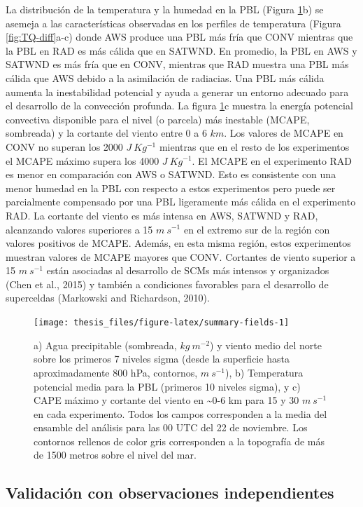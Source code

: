 \documentclass[12pt,oneside,a4paper]{reedthesis}
\begin{document}
La distribución de la temperatura y la humedad en la PBL (Figura \ref{fig:summary-fields}b) se asemeja a las características observadas en los perfiles de temperatura (Figura \ref{fig:TQ-diff}a-c) donde AWS produce una PBL más fría que CONV mientras que la PBL en RAD es más cálida que en SATWND. En promedio, la PBL en AWS y SATWND es más fría que en CONV, mientras que RAD muestra una PBL más cálida que AWS debido a la asimilación de radiacias. Una PBL más cálida aumenta la inestabilidad potencial y ayuda a generar un entorno adecuado para el desarrollo de la convección profunda. La figura \ref{fig:summary-fields}c muestra la energía potencial convectiva disponible para el nivel (o parcela) más inestable (MCAPE, sombreada) y la cortante del viento entre 0 a 6 \(km\). Los valores de MCAPE en CONV no superan los 2000 \(J\ Kg^{-1}\) mientras que en el resto de los experimentos el MCAPE máximo supera los 4000 \(J\ Kg^{-1}\). El MCAPE en el experimento RAD es menor en comparación con AWS o SATWND. Esto es consistente con una menor humedad en la PBL con respecto a estos experimentos pero puede ser parcialmente compensado por una PBL ligeramente más cálida en el experimento RAD. La cortante del viento es más intensa en AWS, SATWND y RAD, alcanzando valores superiores a 15 \(m\ s^{-1}\) en el extremo sur de la región con valores positivos de MCAPE. Además, en esta misma región, estos experimentos muestran valores de MCAPE mayores que CONV. Cortantes de viento superior a 15 \(m\ s^{-1}\) están asociadas al desarrollo de SCMs más intensos y organizados (Chen et al., 2015) y también a condiciones favorables para el desarrollo de superceldas (Markowski and Richardson, 2010).


\begin{figure}
\texttt{[image: thesis\_files/figure-latex/summary-fields-1]} \caption{a) Agua precipitable (sombreada, \(kg\ m^{-2}\)) y viento medio del norte sobre los primeros 7 niveles sigma (desde la superficie hasta aproximadamente 800 hPa, contornos, \(m\ s^{-1}\)), b) Temperatura potencial media para la PBL (primeros 10 niveles sigma), y c) CAPE máximo y cortante del viento en \textasciitilde0-6 km para 15 y 30 \(m\ s^{-1}\) en cada experimento. Todos los campos corresponden a la media del ensamble del análisis para las 00 UTC del 22 de noviembre. Los contornos rellenos de color gris corresponden a la topografía de más de 1500 metros sobre el nivel del mar.}\label{fig:summary-fields}
\end{figure}
\hypertarget{val-analisis}{%
\subsection{Validación con observaciones independientes}\label{val-analisis}}
\end{document}
